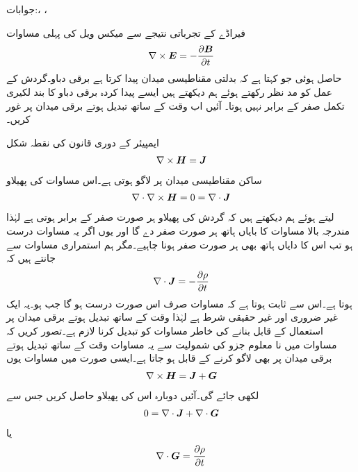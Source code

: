 جوابات:، ، 


فیراڈے کے تجرباتی نتیجے سے میکس ویل کی پہلی مساوات
\begin{align}
\nabla \times {\ensuremath{{\boldsymbol{E}}}}=-\frac{\partial {\ensuremath{{\boldsymbol{B}}}}}{\partial t}
\end{align}
حاصل ہوئی جو کہتا ہے کہ بدلتی مقناطیسی میدان پیدا کرتا ہے برقی دباو۔گردش کے عمل کو مد نظر رکھتے ہوئے ہم دیکھتے ہیں ایسے پیدا کردہ برقی دباو کا بند لکیری تکمل صفر کے برابر نہیں ہوتا۔ آئیں اب وقت کے ساتھ تبدیل ہوتے برقی میدان پر غور کریں۔

ایمپیئر کے دوری قانون کی نقطہ شکل
\begin{align}\label{مساوات_میکس_ویل_ایمپیئر_دوری_نقطہ_صورت}
\nabla \times {\ensuremath{{\boldsymbol{H}}}}={{\boldsymbol{J}}}
\end{align}
ساکن مقناطیسی میدان پر لاگو ہوتی ہے۔اس مساوات کی پھیلاو
\begin{align*}
\nabla \cdot \nabla \times {\ensuremath{{\boldsymbol{H}}}}=0=\nabla \cdot {\ensuremath{{\boldsymbol{J}}}}
\end{align*}
 لیتے ہوئے ہم دیکھتے ہیں کہ گردش کی پھیلاو ہر صورت صفر کے برابر ہوتی ہے لہٰذا مندرجہ بالا مساوات کا بایاں ہاتھ ہر صورت صفر دے گا اور یوں اگر یہ مساوات درست ہو تب اس کا دایاں ہاتھ بھی ہر صورت صفر ہونا چاہیے۔مگر ہم استمراری  مساوات سے جانتے ہیں کہ
\begin{align}
\nabla \cdot {\ensuremath{{\boldsymbol{J}}}}=-\frac{\partial \rho}{\partial t}
\end{align} 
ہوتا ہے۔اس سے ثابت ہوتا ہے کہ مساوات  صرف اس صورت درست ہو گا جب  ہو۔یہ ایک غیر ضروری اور غیر حقیقی شرط ہے لہٰذا وقت کے ساتھ تبدیل ہوتے برقی میدان پر استعمال کے قابل بنانے کی خاطر  مساوات  کو تبدیل کرنا لازم ہے۔تصور کریں کہ مساوات  میں نا معلوم جزو  کی شمولیت سے یہ مساوات وقت  کے ساتھ تبدیل ہوتے برقی میدان پر بھی لاگو کرنے کے قابل ہو جاتا ہے۔ایسی صورت میں مساوات  یوں
\begin{align*}
\nabla \times {\ensuremath{{\boldsymbol{H}}}}={{\boldsymbol{J}}}+{{\boldsymbol{G}}}
\end{align*}
لکھی جائے گی۔آئیں دوبارہ اس کی پھیلاو حاصل کریں جس سے
\begin{align*}
0=\nabla \cdot {\ensuremath{{\boldsymbol{J}}}}+\nabla \cdot {\ensuremath{{\boldsymbol{G}}}}
\end{align*}
یا
\begin{align*}
\nabla \cdot {\ensuremath{{\boldsymbol{G}}}}=\frac{\partial \rho}{\partial t}
\end{align*}
